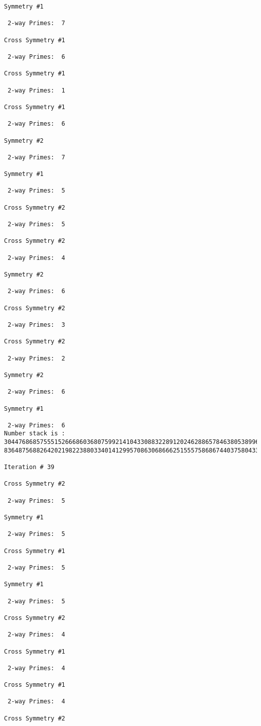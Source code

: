 \begin{verbatim}
Symmetry #1

 2-way Primes: 	7

Cross Symmetry #1

 2-way Primes: 	6

Cross Symmetry #1

 2-way Primes: 	1

Cross Symmetry #1

 2-way Primes: 	6

Symmetry #2

 2-way Primes: 	7

Symmetry #1

 2-way Primes: 	5

Cross Symmetry #2

 2-way Primes: 	5

Cross Symmetry #2

 2-way Primes: 	4

Symmetry #2

 2-way Primes: 	6

Cross Symmetry #2

 2-way Primes: 	3

Cross Symmetry #2

 2-way Primes: 	2

Symmetry #2

 2-way Primes: 	6

Symmetry #1

 2-way Primes: 	6
Number stack is :
30447686857555152666860368075992141043308832289120246288657846380538996794608835958544046240163340857
83648756882642021982238803340141299570863068666251555758686744037580433610426404458595388064976998350

Iteration #	39

Cross Symmetry #2

 2-way Primes: 	5

Symmetry #1

 2-way Primes: 	5

Cross Symmetry #1

 2-way Primes: 	5

Symmetry #1

 2-way Primes: 	5

Cross Symmetry #2

 2-way Primes: 	4

Cross Symmetry #1

 2-way Primes: 	4

Cross Symmetry #1

 2-way Primes: 	4

Cross Symmetry #2


\end{verbatim}
